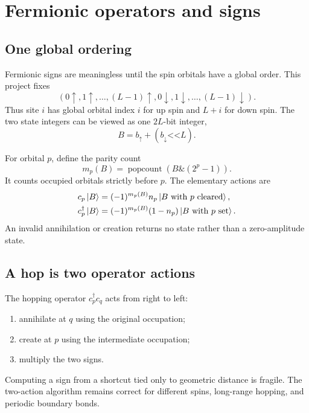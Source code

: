 \chapter{Fermionic operators and signs}
\label{chap:operators}

\section{One global ordering}

Fermionic signs are meaningless until the spin orbitals have a global order.
This project fixes
\begin{equation}
(0\uparrow,1\uparrow,\ldots,(L-1)\uparrow,
 0\downarrow,1\downarrow,\ldots,(L-1)\downarrow).
\label{eq:ordering}
\end{equation}
Thus site $i$ has global orbital index $i$ for up spin and $L+i$ for down
spin.  The two state integers can be viewed as one $2L$-bit integer,
\begin{equation}
B=b_\uparrow+(b_\downarrow\mathbin{\texttt{<<}}L).
\end{equation}

For orbital $p$, define the parity count
\begin{equation}
m_p(B)=\operatorname{popcount}\left(B\mathbin{\texttt{\&}}(2^p-1)\right).
\end{equation}
It counts occupied orbitals strictly before $p$.  The elementary actions are
\begin{align}
c_p\left\lvert B \right\rangle &=( -1)^{m_p(B)}n_p\left\lvert B\text{ with }p\text{ cleared} \right\rangle,\\
c_p^\dagger\left\lvert B \right\rangle &=( -1)^{m_p(B)}(1-n_p)
\left\lvert B\text{ with }p\text{ set} \right\rangle.
\end{align}
An invalid annihilation or creation returns no state rather than a zero-amplitude
state.

\section{A hop is two operator actions}

The hopping operator $c_p^\dagger c_q$ acts from right to left:
\begin{enumerate}
\item annihilate at $q$ using the original occupation;
\item create at $p$ using the intermediate occupation;
\item multiply the two signs.
\end{enumerate}
Computing a sign from a shortcut tied only to geometric distance is fragile.
The two-action algorithm remains correct for different spins, long-range
hopping, and periodic boundary bonds.

